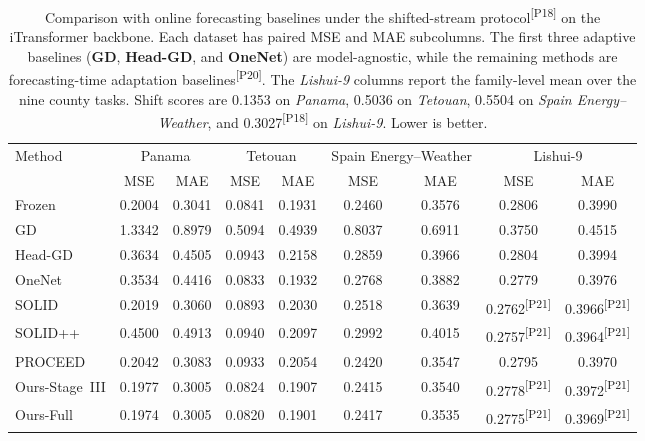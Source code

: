 ﻿\documentclass[journal]{IEEEtran}
\DeclareRobustCommand{\auditbad}[2]{{\color{auditred}#1}{\color{auditred}\textsuperscript{[#2]}}}
\begin{document}
\begin{table}[t]
\caption{Comparison with online forecasting baselines under the \auditbad{shifted-stream protocol}{P18} on the iTransformer backbone. Each dataset has paired MSE and MAE subcolumns. The first three adaptive baselines (\textbf{GD}, \textbf{Head-GD}, and \textbf{OneNet}) are model-agnostic, while the remaining methods are \auditbad{forecasting-time adaptation baselines}{P20}. The \textit{Lishui-9} columns report the family-level mean over the nine county tasks. Shift scores are 0.1353 on \textit{Panama}, 0.5036 on \textit{Tetouan}, 0.5504 on \textit{Spain Energy--Weather}, and \auditbad{0.3027}{P18} on \textit{Lishui-9}. Lower is better.}
\label{tab:shifted_online_sota}
\centering
\footnotesize
\setlength{\tabcolsep}{3.5pt}
\begin{tabular}{lcccccccc}
\toprule
Method & \multicolumn{2}{c}{Panama} & \multicolumn{2}{c}{Tetouan} & \multicolumn{2}{c}{Spain Energy--Weather} & \multicolumn{2}{c}{Lishui-9} \\
\cmidrule(lr){2-3}\cmidrule(lr){4-5}\cmidrule(lr){6-7}\cmidrule(lr){8-9}
 & MSE & MAE & MSE & MAE & MSE & MAE & MSE & MAE \\
\midrule
Frozen & 0.2004 & 0.3041 & 0.0841 & 0.1931 & 0.2460 & 0.3576 & 0.2806 & 0.3990 \\
GD & 1.3342 & 0.8979 & 0.5094 & 0.4939 & 0.8037 & 0.6911 & 0.3750 & 0.4515 \\
Head-GD & 0.3634 & 0.4505 & 0.0943 & 0.2158 & 0.2859 & 0.3966 & 0.2804 & 0.3994 \\
OneNet & 0.3534 & 0.4416 & 0.0833 & 0.1932 & 0.2768 & 0.3882 & 0.2779 & 0.3976 \\
SOLID & 0.2019 & 0.3060 & 0.0893 & 0.2030 & 0.2518 & 0.3639 & \auditbad{0.2762}{P21} & \auditbad{0.3966}{P21} \\
SOLID++ & 0.4500 & 0.4913 & 0.0940 & 0.2097 & 0.2992 & 0.4015 & \auditbad{0.2757}{P21} & \auditbad{0.3964}{P21} \\
PROCEED & 0.2042 & 0.3083 & 0.0933 & 0.2054 & 0.2420 & 0.3547 & 0.2795 & 0.3970 \\
Ours-Stage~III & 0.1977 & 0.3005 & 0.0824 & 0.1907 & 0.2415 & 0.3540 & \auditbad{0.2778}{P21} & \auditbad{0.3972}{P21} \\
Ours-Full & 0.1974 & 0.3005 & 0.0820 & 0.1901 & 0.2417 & 0.3535 & \auditbad{0.2775}{P21} & \auditbad{0.3969}{P21} \\
\bottomrule
\end{tabular}
\end{table}
\end{document}

